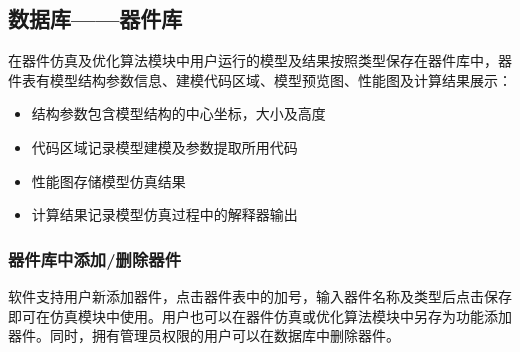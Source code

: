 \documentclass[a4paper,10pt,english]{sphinxmanual}
\begin{document}
{{\sphinxAtStartPar
{}





\begin{sphinxVerbatim}[commandchars=\\\{\}]
  
\end{sphinxVerbatim}


\subsection{数据库——器件库}
\label{\detokenize{_u8f6f_u4ef6_u6a21_u5757_u4ecb_u7ecd/_u6570_u636e_u5e93/contents:id3}}
\sphinxAtStartPar
在器件仿真及优化算法模块中用户运行的模型及结果按照类型保存在器件库中，器件表有模型结构参数信息、建模代码区域、模型预览图、性能图及计算结果展示：


\sphinxAtStartPar
{}




\begin{itemize}
\item {} 
\sphinxAtStartPar
结构参数包含模型结构的中心坐标，大小及高度

\item {} 
\sphinxAtStartPar
代码区域记录模型建模及参数提取所用代码

\item {} 
\sphinxAtStartPar
性能图存储模型仿真结果

\item {} 
\sphinxAtStartPar
计算结果记录模型仿真过程中的解释器输出

\end{itemize}


\subsubsection{器件库中添加/删除器件}
\label{\detokenize{_u8f6f_u4ef6_u6a21_u5757_u4ecb_u7ecd/_u6570_u636e_u5e93/contents:id4}}
\sphinxAtStartPar
软件支持用户新添加器件，点击器件表中的加号，输入器件名称及类型后点击保存即可在仿真模块中使用。用户也可以在器件仿真或优化算法模块中另存为功能添加器件。同时，拥有管理员权限的用户可以在数据库中删除器件。


}}
\end{document}
